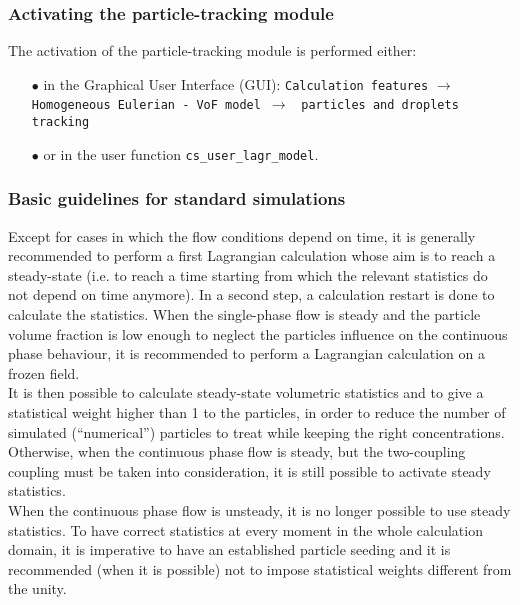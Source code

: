 \subsubsection{Activating the particle-tracking module}\label{sec:acti-lag}

The activation of the particle-tracking module is performed either:
%
\begin{itemize}
 \item [$\bullet$] in the Graphical User Interface (GUI): \texttt{Calculation features} $\rightarrow$ \texttt{Homogeneous Eulerian - VoF model}~$\rightarrow$ ~\texttt{particles and droplets tracking}
 \item [$\bullet$] or in the user function \texttt{cs\_user\_lagr\_model}.
\end{itemize}

\subsubsection{Basic guidelines for standard simulations}

Except for cases in which the flow conditions depend on time, it is generally recommended to perform a first Lagrangian calculation whose aim is to reach a steady-state (i.e. to reach a time starting from which the relevant statistics do not depend on time anymore). In a second step, a calculation restart is done to calculate the statistics. When the single-phase flow is steady and the particle volume fraction is low enough to neglect the particles influence on the continuous phase behaviour, it is recommended to perform a Lagrangian calculation on a frozen field.\\

It is then possible to calculate steady-state volumetric statistics and to give a statistical weight higher than 1 to the particles, in order to reduce the number of simulated (``numerical'') particles to treat while keeping the right concentrations. Otherwise, when the continuous phase flow is steady, but the two-coupling coupling must be taken into consideration, it is still possible to activate steady statistics. \\
When the continuous phase flow is unsteady, it is no longer possible to use steady statistics. To have correct statistics at every moment in the whole calculation domain, it is imperative to have an established particle seeding and it is recommended (when it is possible) not to impose statistical weights different from the unity. \\

